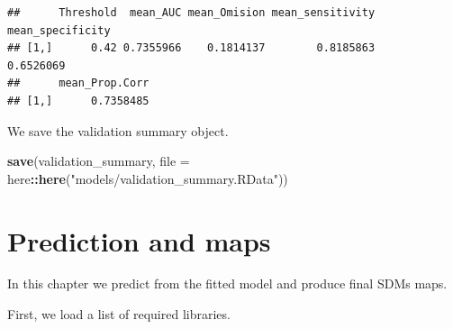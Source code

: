 \documentclass[
]{book}
\newenvironment{Shaded}{\begin{snugshade}}{\end{snugshade}}
\newcommand{\AttributeTok}[1]{\textcolor[rgb]{0.13,0.29,0.53}{#1}}
\newcommand{\CommentTok}[1]{\textcolor[rgb]{0.56,0.35,0.01}{\textit{#1}}}
\newcommand{\FunctionTok}[1]{\textcolor[rgb]{0.13,0.29,0.53}{\textbf{#1}}}
\newcommand{\NormalTok}[1]{#1}
\newcommand{\OtherTok}[1]{\textcolor[rgb]{0.56,0.35,0.01}{#1}}
\newcommand{\SpecialCharTok}[1]{\textcolor[rgb]{0.81,0.36,0.00}{\textbf{#1}}}
\newcommand{\StringTok}[1]{\textcolor[rgb]{0.31,0.60,0.02}{#1}}
\begin{document}
\begin{Shaded}
\end{Shaded}

\begin{verbatim}
##      Threshold  mean_AUC mean_Omision mean_sensitivity mean_specificity
## [1,]      0.42 0.7355966    0.1814137        0.8185863        0.6526069
##      mean_Prop.Corr
## [1,]      0.7358485
\end{verbatim}

We save the validation summary object.

\begin{Shaded}
\begin{Highlighting}[]
\FunctionTok{save}\NormalTok{(validation\_summary, }\AttributeTok{file =}\NormalTok{ here}\SpecialCharTok{::}\FunctionTok{here}\NormalTok{(}\StringTok{"models/validation\_summary.RData"}\NormalTok{))}
\end{Highlighting}
\end{Shaded}

\chapter{Prediction and maps}\label{prediction-and-maps}

In this chapter we predict from the fitted model and produce final SDMs maps.

First, we load a list of required libraries.
\end{document}
